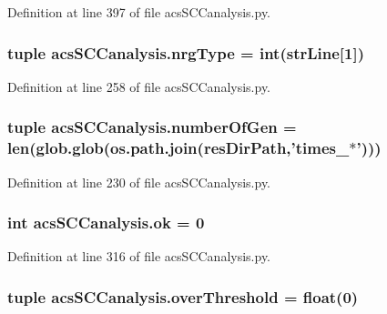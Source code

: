 Definition at line 397 of file acs\-S\-C\-Canalysis.\-py.

\hypertarget{a00102_a0d0c83fd90489be59b1f5a31dadf4469}{
\subsubsection[{nrg\-Type}]{\setlength{\rightskip}{0pt plus 5cm}tuple acs\-S\-C\-Canalysis.\-nrg\-Type = int({\bf str\-Line}\mbox{[}1\mbox{]})}}\label{a00102_a0d0c83fd90489be59b1f5a31dadf4469}


Definition at line 258 of file acs\-S\-C\-Canalysis.\-py.

\hypertarget{a00102_a9a81829f850e2e125e3c94214da7a1f0}{
\subsubsection[{number\-Of\-Gen}]{\setlength{\rightskip}{0pt plus 5cm}tuple acs\-S\-C\-Canalysis.\-number\-Of\-Gen = len(glob.\-glob(os.\-path.\-join({\bf res\-Dir\-Path},'times\-\_\-$\ast$')))}}\label{a00102_a9a81829f850e2e125e3c94214da7a1f0}


Definition at line 230 of file acs\-S\-C\-Canalysis.\-py.

\hypertarget{a00102_a9ce833d782f17d858941cfa76914599a}{
\subsubsection[{ok}]{\setlength{\rightskip}{0pt plus 5cm}int acs\-S\-C\-Canalysis.\-ok = 0}}\label{a00102_a9ce833d782f17d858941cfa76914599a}


Definition at line 316 of file acs\-S\-C\-Canalysis.\-py.

\hypertarget{a00102_a12e61f8d7aadb52256a7728af342bae3}{
\subsubsection[{over\-Threshold}]{\setlength{\rightskip}{0pt plus 5cm}tuple acs\-S\-C\-Canalysis.\-over\-Threshold = float(0)}}\label{a00102_a12e61f8d7aadb52256a7728af342bae3}


